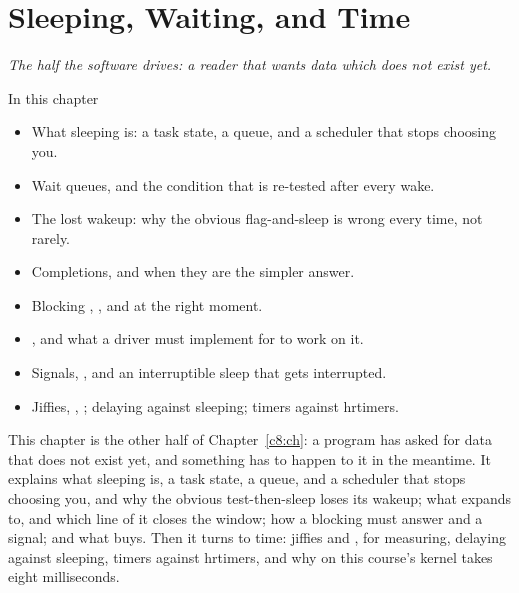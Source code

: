 
\chapter{Sleeping, Waiting, and Time}
\label{c9:ch}

{\large\itshape The half the software drives: a reader that wants data which does not exist
yet.\par}

\begin{chapterbox}{In this chapter}
\begin{itemize}
  \item What sleeping is: a task state, a queue, and a scheduler that stops choosing you.
  \item Wait queues, and the condition that is re-tested after every wake.
  \item The lost wakeup: why the obvious flag-and-sleep is wrong every time, not rarely.
  \item Completions, and when they are the simpler answer.
  \item Blocking , , and  at the right moment.
  \item {}, and what a driver must implement for  to work on it.
  \item Signals, , and an interruptible sleep that gets interrupted.
  \item Jiffies, , ; delaying against sleeping; timers against hrtimers.
\end{itemize}
\end{chapterbox}

This chapter is the other half of Chapter~\ref{c8:ch}: a program has asked for data that does not
exist yet, and something has to happen to it in the meantime. It explains what sleeping is, a task
state, a queue, and a scheduler that stops choosing you, and why the obvious test-then-sleep loses
its wakeup; what  expands to, and which line of it closes the window;
how a blocking  must answer  and a signal; and what  buys.
Then it turns to time: jiffies and ,  for measuring, delaying against
sleeping, timers against hrtimers, and why  on this course's kernel takes eight
milliseconds.

